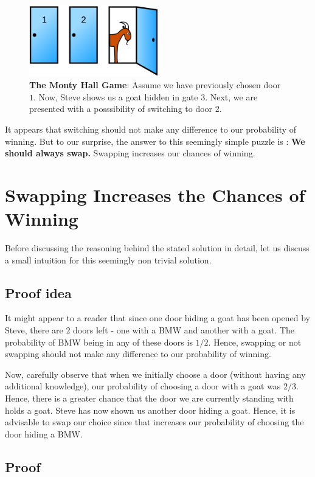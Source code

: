 \documentclass{book}
\begin{document}
\begin{figure}[h!]
\centering
\includegraphics[width=0.5\textwidth]{monty.png}
\caption{\textbf{The Monty Hall Game}: Assume we have previously chosen door $1$. Now, Steve shows us a goat hidden in gate $3$. Next, we are presented with a posssibility of switching to door $2$.}
\label{monty}
\end{figure}

It appears that switching should not make any difference to our probability of winning. But to our surprise, the answer to this seemingly simple puzzle is : {\large{\textbf{We should always swap.}}} Swapping increases our chances of winning. 

\section{Swapping Increases the Chances of Winning}

Before discussing the reasoning behind the stated solution in detail, let us discuss a small intuition for this seemingly non trivial solution. 

\subsection{Proof idea}
It might appear to a reader that since one door hiding a goat has been opened by Steve, there are $2$ doors left - one with a BMW and another with a goat. The probability of BMW being in any of these doors is $1/2$. Hence, swapping or not swapping should not make any difference to our probability of winning. 

Now, carefully observe that when we initially choose a door (without having any additional knowledge), our probability of choosing a door with a goat was $2/3$. Hence, there is a greater chance that the door we are currently standing with holds a goat. Steve has now shown us another door hiding a goat. Hence, it is advisable to swap our choice since that increases our probability of choosing the door hiding a BMW. 

\subsection{Proof} 
\end{document}
